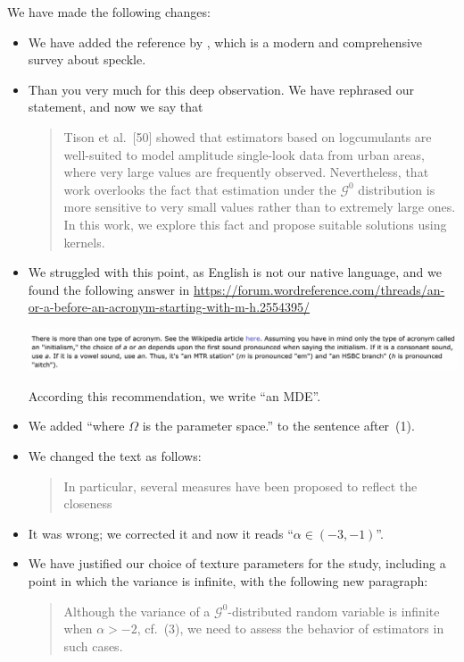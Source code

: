 \documentclass{ar2rc}
\begin{document}
	\AR We have made the following changes:
	\begin{itemize}
		\item We have added the reference by \citet{SARImageStatisticalModelingPartISinglePixelStatisticalModels}, which is a modern and comprehensive survey about speckle.
		\item Than you very much for this deep observation. We have rephrased our statement, and now we say that
		\begin{quote}
			Tison et al.~[50] showed that estimators based on logcumulants 
			are well-suited to model amplitude single-look data from urban areas, where very large values are frequently observed.
			Nevertheless, that work overlooks the fact that estimation under the $\mathcal G^0$ distribution is more sensitive to very small values rather than to extremely large ones.
			In this work, we explore this fact and propose suitable solutions using kernels.
		\end{quote}
		\item We struggled with this point, as English is not our native language, and we found the following answer in \url{https://forum.wordreference.com/threads/an-or-a-before-an-acronym-starting-with-m-h.2554395/}
		\begin{center}
			\includegraphics[width=\linewidth]{AorAN.png}
		\end{center}
		According this recommendation, we write ``an MDE''.
		\item We added ``where $\Omega$ is the parameter space.'' to the sentence after~(1).
		\item We changed the text as follows:
		\begin{quote}
			In particular, several measures have been proposed to reflect the closeness  \DIFdelbegin {} \DIFdelend \DIFaddbegin {}\DIFaddend
		\end{quote}
		\item It was wrong; we corrected it and now it reads ``$\alpha \in (-3,-1)$''.
		\item We have justified our choice of texture parameters for the study, including a point in which the variance is infinite, with the following new paragraph:
		\begin{quote}
			Although the variance of a $\mathcal{G}^0$-distributed random variable is infinite when $\alpha>-2$, cf.~(3), we need to assess the behavior of estimators in such cases.

\end{quote}
\end{itemize}
\end{document}
